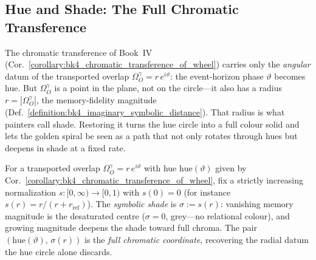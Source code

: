 \subsection{Hue and Shade: The Full Chromatic Transference}
\label{subsec:bk5_hue_and_shade}
The chromatic transference of Book~IV
(Cor.~\ref{corollary:bk4_chromatic_transference_of_wheel}) carries only the
\emph{angular} datum of the transported overlap $\Omega_O^\gamma=r\,e^{i\vartheta}$:
the event-horizon phase $\vartheta$ becomes hue. But $\Omega_O^\gamma$ is a point in
the plane, not on the circle---it also has a radius $r=|\Omega_O^\gamma|$, the
memory-fidelity magnitude
(Def.~\ref{definition:bk4_imaginary_symbolic_distance}). That radius is what painters
call shade. Restoring it turns the hue circle into a full colour solid and lets the
golden spiral be seen as a path that not only rotates through hues but deepens in
shade at a fixed rate.

\begin{definition}
\label{definition:bk5_symbolic_shade}
For a transported overlap $\Omega_O^\gamma=r\,e^{i\vartheta}$ with hue
$\mathrm{hue}(\vartheta)$ given by
Cor.~\ref{corollary:bk4_chromatic_transference_of_wheel}, fix a strictly increasing
normalization $s:[0,\infty)\to[0,1)$ with $s(0)=0$ (for instance
$s(r)=r/(r+r_{\mathrm{ref}})$). The \emph{symbolic shade} is $\sigma:=s(r)$:
vanishing memory magnitude is the desaturated centre ($\sigma=0$, grey---no
relational colour), and growing magnitude deepens the shade toward full chroma. The
pair $(\mathrm{hue}(\vartheta),\,\sigma(r))$ is the \emph{full chromatic coordinate},
recovering the radial datum the hue circle alone discards.
\end{definition}

